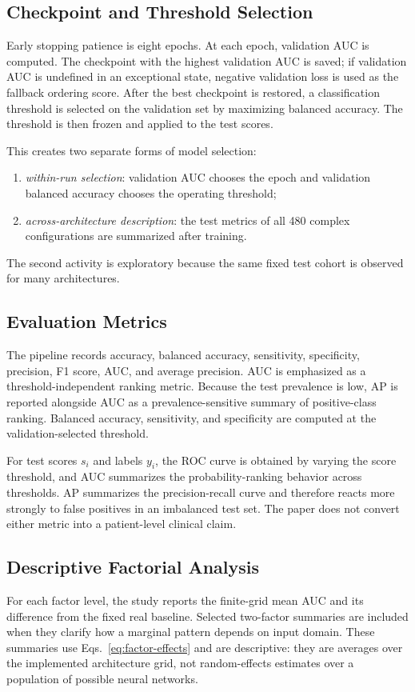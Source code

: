 \subsection{Checkpoint and Threshold Selection}
Early stopping patience is eight epochs. At each epoch, validation AUC is computed. The checkpoint with the highest validation AUC is saved; if validation AUC is undefined in an exceptional state, negative validation loss is used as the fallback ordering score. After the best checkpoint is restored, a classification threshold is selected on the validation set by maximizing balanced accuracy. The threshold is then frozen and applied to the test scores.

This creates two separate forms of model selection:
\begin{enumerate}
    \item \emph{within-run selection}: validation AUC chooses the epoch and validation balanced accuracy chooses the operating threshold;
    \item \emph{across-architecture description}: the test metrics of all 480 complex configurations are summarized after training.
\end{enumerate}
The second activity is exploratory because the same fixed test cohort is observed for many architectures.

\subsection{Evaluation Metrics}
The pipeline records accuracy, balanced accuracy, sensitivity, specificity, precision, F1 score, AUC, and average precision. AUC is emphasized as a threshold-independent ranking metric. Because the test prevalence is low, AP is reported alongside AUC as a prevalence-sensitive summary of positive-class ranking. Balanced accuracy, sensitivity, and specificity are computed at the validation-selected threshold.

For test scores $s_i$ and labels $y_i$, the ROC curve is obtained by varying the score threshold, and AUC summarizes the probability-ranking behavior across thresholds. AP summarizes the precision-recall curve and therefore reacts more strongly to false positives in an imbalanced test set. The paper does not convert either metric into a patient-level clinical claim.


\subsection{Descriptive Factorial Analysis}
For each factor level, the study reports the finite-grid mean AUC and its difference from the fixed real baseline. Selected two-factor summaries are included when they clarify how a marginal pattern depends on input domain. These summaries use Eqs.~\eqref{eq:factor-effects} and are descriptive: they are averages over the implemented architecture grid, not random-effects estimates over a population of possible neural networks.

